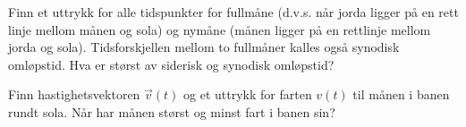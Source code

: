 \documentclass{../../myassignment}
\begin{document}
	\begin{problem}
		Finn et uttrykk for alle tidspunkter for fullmåne (d.v.s. når jorda ligger på en rett linje mellom månen og sola) og nymåne (månen ligger på en rettlinje mellom jorda og sola). Tidsforskjellen mellom to fullmåner kalles også synodisk omløpstid. Hva er størst av siderisk og synodisk omløpstid?	
	\end{problem}	

	\begin{problem}
		Finn hastighetsvektoren $\vec{v}(t)$ og et uttrykk for farten $v(t)$ til månen i banen rundt sola. Når har månen størst og minst fart i banen sin?
	\end{problem}
\end{document}
